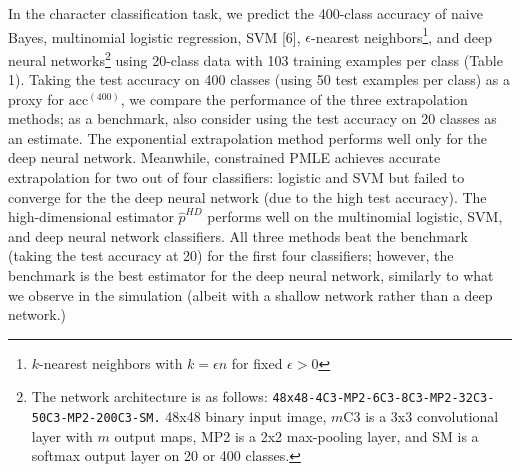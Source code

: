\documentclass{article}
\begin{document}
In the character classification task, we predict the 400-class accuracy of naive Bayes, multinomial
logistic regression, SVM [6], $\epsilon$-nearest neighbors\footnote{$k$-nearest neighbors with $k = \epsilon n$ for fixed $\epsilon > 0$}, and deep neural networks\footnote{The network architecture is as follows: 
{\tt 48x48-4C3-MP2-6C3-8C3-MP2-32C3-50C3-MP2-200C3-SM.}
48x48 binary input image, $m$C3 is a 3x3 convolutional layer with $m$ output maps, MP2 is a 2x2 max-pooling layer, and SM is a softmax output layer on 20 or 400 classes.} using 20-class data with 103 training examples per class (Table 1).
Taking the test accuracy on 400 classes (using 50 test examples per class) as a proxy for $\text{acc}^{(400)}$,
we compare the performance of the three extrapolation methods; as a benchmark,
also consider using the test accuracy on 20 classes as an estimate.
The exponential extrapolation method performs well only for the deep neural network.  Meanwhile, constrained PMLE achieves accurate extrapolation for two out of four classifiers: logistic and SVM
but failed to converge for the the deep neural network (due to the high test accuracy).
The high-dimensional estimator $\hat{p}^{HD}$  performs well on the multinomial logistic, SVM, and deep neural network classifiers.  All three methods beat the benchmark (taking the test accuracy at 20) for the first four classifiers;
however, the benchmark is the best estimator for the deep neural network,
similarly to what we observe in the simulation (albeit with a shallow network rather than a deep network.)
\end{document}
